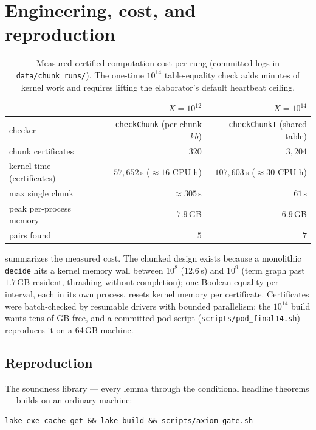 \documentclass[11pt]{article}
\theoremstyle{definition}
\theoremstyle{remark}
\newcommand{\code}[1]{\texttt{#1}}
\begin{document}
\section{Engineering, cost, and reproduction}\label{sec:cost}

\begin{table}[t]
\centering
\begin{tabular}{l r r}
\toprule
& $X = 10^{12}$ & $X = 10^{14}$ \\
\midrule
checker & \code{checkChunk} (per-chunk $kb$) & \code{checkChunkT} (shared table) \\
chunk certificates & $320$ & $3{,}204$ \\
kernel time (certificates) & $57{,}652$\,s ($\approx 16$ CPU-h) & $107{,}603$\,s ($\approx 30$ CPU-h) \\
max single chunk & $\approx 305$\,s & $61$\,s \\
peak per-process memory & $7.9$\,GB & $6.9$\,GB \\
pairs found & $5$ & $7$ \\
\bottomrule
\end{tabular}
\caption{Measured certified-computation cost per rung (committed logs in
\code{data/chunk\_runs/}). The one-time $10^{14}$ table-equality check
adds minutes of kernel work and requires lifting the elaborator's
default heartbeat ceiling.}
\label{tab:cost}
\end{table}

 summarizes the measured cost. The chunked design exists
because a monolithic \code{decide} hits a kernel memory wall between
$10^8$ ($12.6$\,s) and $10^9$ (term graph past $1.7$\,GB resident,
thrashing without completion); one Boolean equality per interval, each in
its own process, resets kernel memory per certificate. Certificates were
batch-checked by resumable drivers with bounded parallelism; the
$10^{14}$ build wants tens of GB free, and a committed pod script
(\code{scripts/pod\_final14.sh}) reproduces it on a 64\,GB machine.

\subsection{Reproduction}\label{sec:repro}

The soundness library --- every lemma through the conditional headline
theorems --- builds on an ordinary machine:

\begin{lstlisting}
lake exe cache get && lake build && scripts/axiom_gate.sh
\end{lstlisting}
\end{document}
